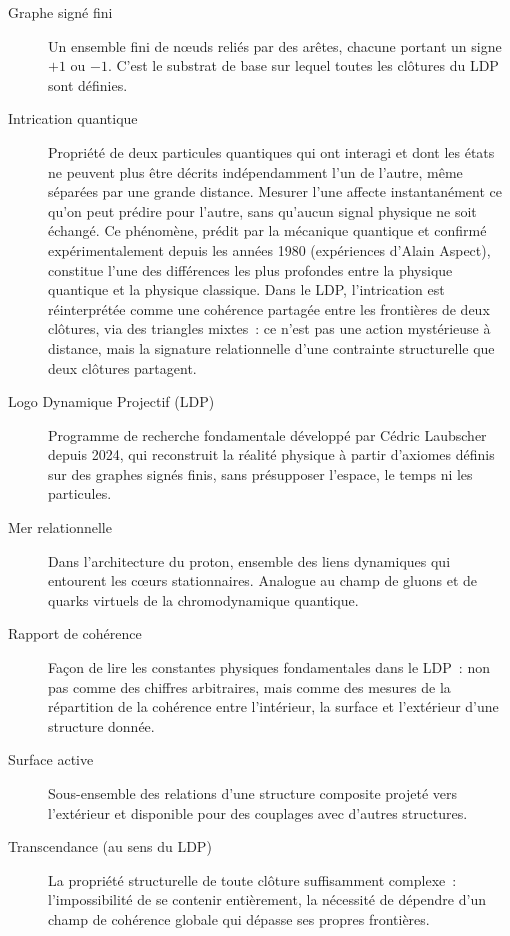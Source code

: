 \documentclass[12pt, a4paper, openright]{book}
\begin{document}
\begin{description}
\item[Graphe signé fini] Un ensemble fini de n\oe{}uds reliés par des arêtes, chacune portant un signe $+1$ ou $-1$. C'est le substrat de base sur lequel toutes les clôtures du LDP sont définies.

\item[Intrication quantique] Propriété de deux particules quantiques qui ont interagi et dont les états ne peuvent plus être décrits indépendamment l'un de l'autre, même séparées par une grande distance. Mesurer l'une affecte instantanément ce qu'on peut prédire pour l'autre, sans qu'aucun signal physique ne soit échangé. Ce phénomène, prédit par la mécanique quantique et confirmé expérimentalement depuis les années 1980 (expériences d'Alain Aspect), constitue l'une des différences les plus profondes entre la physique quantique et la physique classique. Dans le LDP, l'intrication est réinterprétée comme une cohérence partagée entre les frontières de deux clôtures, via des triangles mixtes~: ce n'est pas une action mystérieuse à distance, mais la signature relationnelle d'une contrainte structurelle que deux clôtures partagent.

\item[Logo Dynamique Projectif (LDP)] Programme de recherche fondamentale développé par Cédric Laubscher depuis 2024, qui reconstruit la réalité physique à partir d'axiomes définis sur des graphes signés finis, sans présupposer l'espace, le temps ni les particules.

\item[Mer relationnelle] Dans l'architecture du proton, ensemble des liens dynamiques qui entourent les c\oe{}urs stationnaires. Analogue au champ de gluons et de quarks virtuels de la chromodynamique quantique.

\item[Rapport de cohérence] Façon de lire les constantes physiques fondamentales dans le LDP~: non pas comme des chiffres arbitraires, mais comme des mesures de la répartition de la cohérence entre l'intérieur, la surface et l'extérieur d'une structure donnée.

\item[Surface active] Sous-ensemble des relations d'une structure composite projeté vers l'extérieur et disponible pour des couplages avec d'autres structures.

\item[Transcendance (au sens du LDP)] La propriété structurelle de toute clôture suffisamment complexe~: l'impossibilité de se contenir entièrement, la nécessité de dépendre d'un champ de cohérence globale qui dépasse ses propres frontières.

\end{description}
\end{document}
